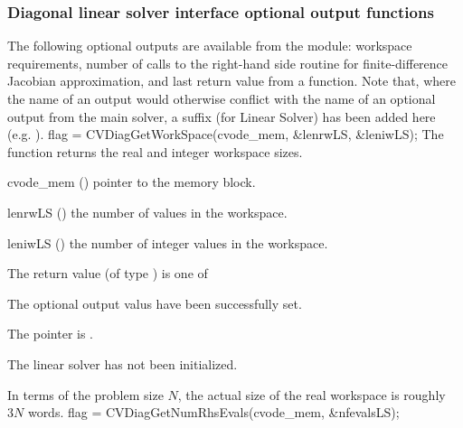 \subsubsection{Diagonal linear solver interface optional output functions}
\label{sss:optout_diag}
The following optional outputs are available from the {\cvdiag} module:
workspace requirements, number of calls to the right-hand side routine for
finite-difference Jacobian approximation, and last return value from a
{\cvdiag} function.
Note that, where the name of an output would otherwise conflict with
the name of an optional output from the main solver, a suffix 
(for Linear Solver) has been added here (e.g.  ).
{
  flag = CVDiagGetWorkSpace(cvode\_mem, \&lenrwLS, \&leniwLS);
}
{
  The function  returns the
  {\cvdiag} real and integer workspace sizes.
}
{
  \begin{args}
  \item[cvode\_mem] ()
    pointer to the {\cvodes} memory block.
  \item[lenrwLS] ()
    the number of  values in the {\cvdiag} workspace.
  \item[leniwLS] ()
    the number of integer values in the {\cvdiag} workspace.
  \end{args}
}
{
  The return value  (of type ) is one of
  \begin{args}
  \item[\Id{CVDIAG\_SUCCESS}]
    The optional output valus have been successfully set.
  \item[\Id{CVDIAG\_MEM\_NULL}]
    The  pointer is .
  \item[\Id{CVDIAG\_LMEM\_NULL}]
    The {\cvdiag} linear solver has not been initialized.
  \end{args}
}
{
  In terms of the problem size $N$, the actual size of the real workspace
  is roughly $3 N$  words.
}
{
  flag = CVDiagGetNumRhsEvals(cvode\_mem, \&nfevalsLS);
}
